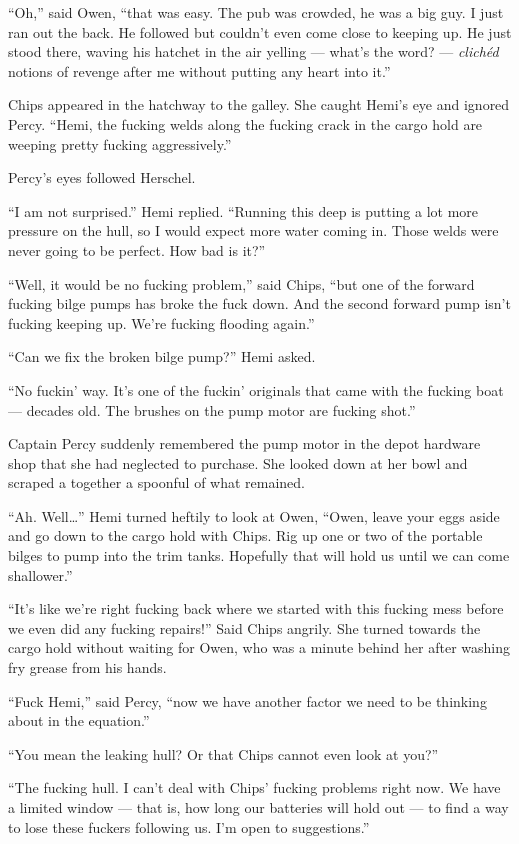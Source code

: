 \documentclass[]{scrbook}
\begin{document}
``Oh,'' said Owen, ``that was easy. The pub was crowded, he was a big
guy. I just ran out the back. He followed but couldn't even come close
to keeping up. He just stood there, waving his hatchet in the air
yelling --- what's the word? --- \emph{clichéd} notions of revenge after
me without putting any heart into it.''

Chips appeared in the hatchway to the galley. She caught Hemi's eye and
ignored Percy. ``Hemi, the fucking welds along the fucking crack in the
cargo hold are weeping pretty fucking aggressively.''

Percy's eyes followed Herschel.

``I am not surprised.'' Hemi replied. ``Running this deep is putting a
lot more pressure on the hull, so I would expect more water coming in.
Those welds were never going to be perfect. How bad is it?''

``Well, it would be no fucking problem,'' said Chips, ``but one of the
forward fucking bilge pumps has broke the fuck down. And the second
forward pump isn't fucking keeping up. We're fucking flooding again.''

``Can we fix the broken bilge pump?'' Hemi asked.

``No fuckin' way. It's one of the fuckin' originals that came with the
fucking boat --- decades old. The brushes on the pump motor are fucking
shot.''

Captain Percy suddenly remembered the pump motor in the depot hardware
shop that she had neglected to purchase. She looked down at her bowl and
scraped a together a spoonful of what remained.

``Ah. Well\ldots{}'' Hemi turned heftily to look at Owen, ``Owen, leave
your eggs aside and go down to the cargo hold with Chips. Rig up one or
two of the portable bilges to pump into the trim tanks. Hopefully that
will hold us until we can come shallower.''

``It's like we're right fucking back where we started with this fucking
mess before we even did any fucking repairs!'' Said Chips angrily. She
turned towards the cargo hold without waiting for Owen, who was a minute
behind her after washing fry grease from his hands.

``Fuck Hemi,'' said Percy, ``now we have another factor we need to be
thinking about in the equation.''

``You mean the leaking hull? Or that Chips cannot even look at you?''

``The fucking hull. I can't deal with Chips' fucking problems right now.
We have a limited window --- that is, how long our batteries will hold
out --- to find a way to lose these fuckers following us. I'm open to
suggestions.''
\end{document}
